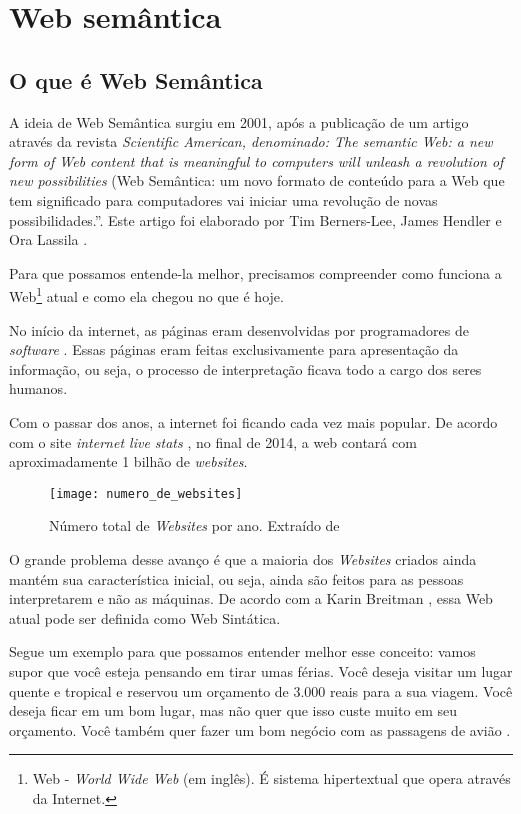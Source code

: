 \chapter{Web semântica}


\section{O que é Web Semântica\?}

A ideia de Web Semântica surgiu em 2001, após a publicação de um artigo através da revista \emph{Scientific American, denominado: The semantic Web: a new form of Web content that is meaningful to computers will unleash a revolution of new possibilities} (Web Semântica: um novo formato de conteúdo para a Web que tem significado para computadores vai iniciar uma revolução de novas possibilidades.”. Este artigo foi elaborado por Tim Berners-Lee, James Hendler e Ora Lassila \cite{intwebsem}.

Para que possamos entende-la melhor, precisamos compreender como funciona a Web\footnote{Web - \emph{World Wide Web} (em inglês). É sistema hipertextual que opera através da Internet.} atual e como ela chegou no que é hoje.

No início da internet, as páginas eram desenvolvidas por programadores de \emph{software} \cite{kbreitman}. Essas páginas eram feitas exclusivamente para apresentação da informação, ou seja, o processo de interpretação ficava todo a cargo dos seres humanos.

Com o passar dos anos, a internet foi ficando cada vez mais popular. De acordo com o site\emph{ internet live stats} \cite{totalwebsite}, no final de 2014, a web contará com aproximadamente 1 bilhão de \emph{websites}.

\graphicspath{{figuras/}}
\begin{figure}[H]
\centering
\texttt{[image: numero\_de\_websites]}
\caption[Número total de Websites por ano.]{Número total de \emph{Websites} por ano. Extraído de \cite{totalwebsite} }
\label{num-website}
\end{figure}

O grande problema desse avanço é que a maioria dos \emph{Websites} criados ainda mantém sua característica inicial, ou seja, ainda são feitos para as pessoas interpretarem  e não as máquinas. De acordo com a Karin Breitman \cite{kbreitman}, essa Web atual pode ser definida como Web Sintática.

Segue um exemplo para que possamos entender melhor esse conceito: vamos supor que você esteja pensando em tirar umas férias. Você deseja visitar um lugar quente e tropical e reservou um orçamento de 3.000 reais para a sua viagem. Você deseja ficar em um bom lugar, mas não quer que isso custe muito em seu orçamento. Você também quer fazer um bom negócio com as passagens de avião \cite{web3}. 

